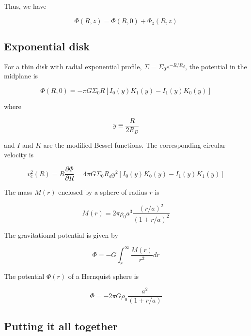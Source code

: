 Thus, we have 

\begin{equation}
\varPhi(R,z) = \varPhi(R,0) + \varPhi_z(R,z)
\end{equation}

\subsection{Exponential disk}

For a thin disk with radial exponential profile, $\Sigma = \Sigma_0 e^{-R/R_d}$, the potential in the midplane is 

\begin{equation}
\varPhi(R,0) = -\pi G\Sigma_0 R \left[ I_0(y) K_1(y) - I_1(y) K_0(y) \right]
\end{equation}

where 

\begin{equation}
y \equiv \frac{R}{2R_D} 
\end{equation}

and $I$ and $K$ are the modified Bessel functions. The corresponding circular velocity is 

\begin{equation}
v^2_c(R) = R\frac{\partial\varPhi}{\partial R}  = 4\pi G\Sigma_0 R_d y^2 \left[ I_0(y) K_0(y) - I_1(y) K_1(y) \right]
\end{equation}

The mass $M(r)$ enclosed by a sphere of radius $r$ is

\begin{equation}
\boxed{
M(r) = 2\pi \rho_0 a^3  \frac{(r/a)^2}{(1+r/a)^2}
}
\end{equation}


The gravitational potential is given by 

\begin{equation}
\varPhi = -G\int_r^{\infty} \frac{M(r)}{r^2} dr
\end{equation}

The potential $\varPhi(r)$ of a Hernquist sphere is

\begin{equation}
\boxed{
\varPhi = -2\pi G \rho_0 \frac{a^2}{(1+r/a)}
}
\end{equation}


\subsection{Putting it all together}

